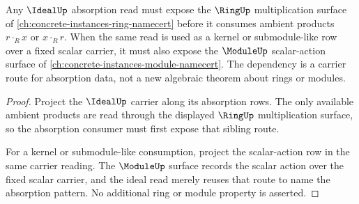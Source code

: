 \begin{theorem}
\label{thm:ideal-ring-carrier-dependency}
Any $\IdealUp$ absorption read must expose the $\RingUp$ multiplication
surface of \autoref{ch:concrete-instances-ring-namecert} before it consumes
ambient products $r\cdot_R x$ or $x\cdot_R r$. When the same read is used as
a kernel or submodule-like row over a fixed scalar carrier, it must also expose
the $\ModuleUp$ scalar-action surface of
\autoref{ch:concrete-instances-module-namecert}. The dependency is a carrier
route for absorption data, not a new algebraic theorem about rings or modules.
\end{theorem}
\begin{proof}
Project the $\IdealUp$ carrier along its absorption rows. The only available
ambient products are read through the displayed $\RingUp$ multiplication
surface, so the absorption consumer must first expose that sibling route.

For a kernel or submodule-like consumption, project the scalar-action row in
the same carrier reading. The $\ModuleUp$ surface records the scalar action
over the fixed scalar carrier, and the ideal read merely reuses that route to
name the absorption pattern. No additional ring or module property is asserted.
\end{proof}
